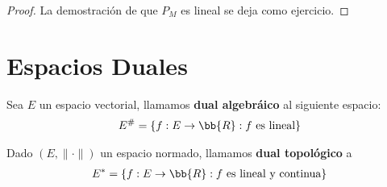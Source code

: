 \begin{coro}
\begin{proof}
        La demostración de que $P_M$ es lineal se deja como ejercicio.
    \end{proof}
\end{coro}

\section{Espacios Duales}

\begin{definicion}
    Sea $E$ un espacio vectorial, llamamos \textbf{dual algebráico} al siguiente espacio:
    \begin{gather*}
        E^\# = \{f: E \to \bb{R}: f \text{ es lineal}\}
    \end{gather*}
\end{definicion}

\begin{definicion}
   Dado $(E, \|\cdot\|)$ un espacio normado, llamamos \textbf{dual topológico} a
    \begin{gather*}
        E^* = \{f: E \to \bb{R}: f \text{ es lineal y continua}\}
    \end{gather*} 
\end{definicion}


